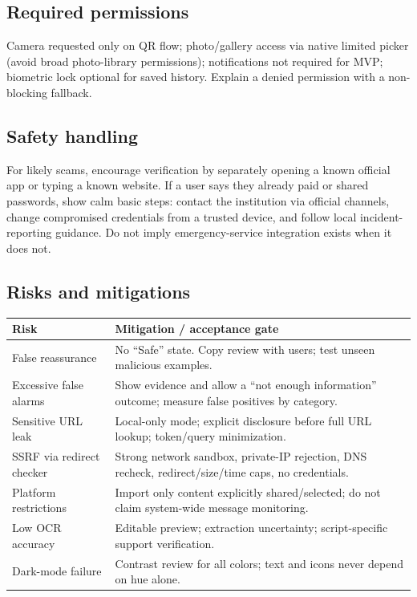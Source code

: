 \documentclass[10pt,a4paper]{article}
\begin{document}
\subsection{Required permissions}
Camera requested only on QR flow; photo/gallery access via native limited picker (avoid broad photo-library permissions); notifications not required for MVP; biometric lock optional for saved history. Explain a denied permission with a non-blocking fallback.
\subsection{Safety handling}
For likely scams, encourage verification by separately opening a known official app or typing a known website. If a user says they already paid or shared passwords, show calm basic steps: contact the institution via official channels, change compromised credentials from a trusted device, and follow local incident-reporting guidance. Do not imply emergency-service integration exists when it does not.
\subsection{Risks and mitigations}
\begin{tabularx}{\linewidth}{@{}p{36mm}Y@{}}\toprule
\textbf{Risk} & \textbf{Mitigation / acceptance gate} \\ \midrule
False reassurance & No ``Safe'' state. Copy review with users; test unseen malicious examples. \\
Excessive false alarms & Show evidence and allow a ``not enough information'' outcome; measure false positives by category. \\
Sensitive URL leak & Local-only mode; explicit disclosure before full URL lookup; token/query minimization. \\
SSRF via redirect checker & Strong network sandbox, private-IP rejection, DNS recheck, redirect/size/time caps, no credentials. \\
Platform restrictions & Import only content explicitly shared/selected; do not claim system-wide message monitoring. \\
Low OCR accuracy & Editable preview; extraction uncertainty; script-specific support verification. \\
Dark-mode failure & Contrast review for all colors; text and icons never depend on hue alone. \\
\bottomrule\end{tabularx}
\end{document}
